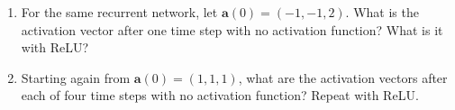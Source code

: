 \begin{enumerate}
\item For the same recurrent network, let $\mathbf{a}(0)=(-1,-1,2)$. What is the activation vector after one time step with no activation function? What is it with ReLU?

\item Starting again from $\mathbf{a}(0)=(1,1,1)$, what are the activation vectors after each of four time steps with no activation function? Repeat with ReLU.
\end{enumerate}
